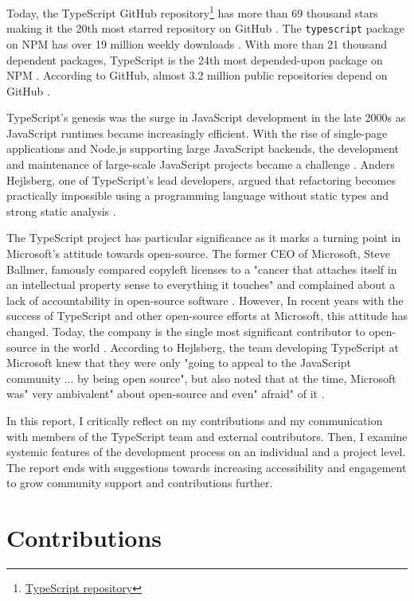 \documentclass[12pt]{scrartcl}
\def\code#1{\texttt{\frenchspacing#1}}
\begin{document}
Today, the TypeScript GitHub repository\footnote{\href{https://github.com/Microsoft/TypeScript}{TypeScript repository}} has more than 69 thousand stars making it the 20th most starred repository on GitHub \cite{RepositoriesRanking}. The \code{typescript} package on NPM has over 19 million weekly downloads \cite{Package}. With more than 21 thousand dependent packages, TypeScript is the 24th most depended-upon package on NPM \cite{PackageDependents}. According to GitHub, almost 3.2 million public repositories depend on GitHub \cite{NetworkDependents}.

TypeScript's genesis was the surge in JavaScript development in the late 2000s as JavaScript runtimes became increasingly efficient. With the rise of single-page applications and Node.js supporting large JavaScript backends, the development and maintenance of large-scale JavaScript projects became a challenge \cite{Foley2012a}. Anders Hejlsberg, one of TypeScript's lead developers, argued that refactoring becomes practically impossible using a programming language without static types and strong static analysis \cite{Cassel2019}.

The TypeScript project has particular significance as it marks a turning point in Microsoft's attitude towards open-source. The former CEO of Microsoft, Steve Ballmer, famously compared copyleft licenses to a "cancer that attaches itself in an intellectual property sense to everything it touches" \cite{ThomasCGreene2001} and complained about a lack of accountability in open-source software \cite{JoeMcKendrick2003}. However, In recent years with the success of TypeScript and other open-source efforts at Microsoft, this attitude has changed. Today, the company is the single most significant contributor to open-source in the world \cite{TomWarren2020}. According to Hejlsberg, the team developing TypeScript at Microsoft knew that they were only "going to appeal to the JavaScript community ... by being open source", but also noted that at the time, Microsoft was" very ambivalent" about open-source and even" afraid" of it \cite{Tung2020}.

In this report, I critically reflect on my contributions and my communication with members of the TypeScript team and external contributors. Then, I examine systemic features of the development process on an individual and a project level. The report ends with suggestions towards increasing accessibility and engagement to grow community support and contributions further.

\section{Contributions}
\end{document}
